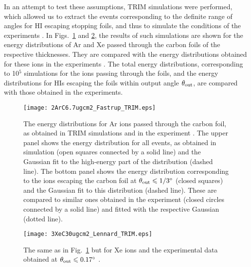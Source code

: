 \documentclass[aps,pra,twocolumn,amsmath,amssymb,floatfix]{revtex4-2}
\begin{document}
In an attempt to test these assumptions, TRIM simulations were performed, which allowed us to extract the events corresponding to the definite range of angles for HI escaping stopping foils, and thus to simulate the conditions of the experiments \cite{Fastrup66,Hvelp68,Lennard86}. In Figs.~\ref{ArTRIM} and \ref{XeTRIM}, the results of such simulations are shown for the energy distributions of Ar and Xe passed through the carbon foils of the respective thicknesses. They are compared with the energy distributions obtained for these ions in the experiments \cite{Fastrup66,Lennard86}. The total energy distributions, corresponding to 10$^{5}$ simulations for the ions passing through the foils, and the energy distributions for HIs escaping the foils within output angle $\theta_{\rm out}$, are compared with those obtained in the experiments.

\begin{figure}[!h]  %
\begin{center}
\texttt{[image: 2ArC6.7ugcm2\_Fastrup\_TRIM.eps]}
\caption{\label{ArTRIM}The energy distributions for Ar ions passed through the carbon foil, as obtained in TRIM simulations and in the experiment \cite{Fastrup66}. The upper panel shows the energy distribution for all events, as obtained in simulation (open squares connected by a solid line) and the Gaussian fit to the high-energy part of the distribution (dashed line). The bottom panel shows the energy distribution corresponding to the ions escaping the carbon foil at $\theta_{\rm out} \leqslant 1/3^{\circ}$ (closed squares) and the Gaussian fit to this distribution (dashed line). These are compared to similar ones obtained in the experiment \cite{Fastrup66} (closed circles connected by a solid line) and fitted with the respective Gaussian (dotted line).}
\end{center}
\end{figure}

\begin{figure}[!h]  %
\begin{center}
\texttt{[image: 3XeC30ugcm2\_Lennard\_TRIM.eps]}
\caption{\label{XeTRIM}The same as in Fig.~\ref{ArTRIM} but for Xe ions and the experimental data obtained at $\theta_{\rm out} \leqslant 0.17^{\circ}$ \cite{Lennard86}.}
\end{center}
\end{figure}
\end{document}
